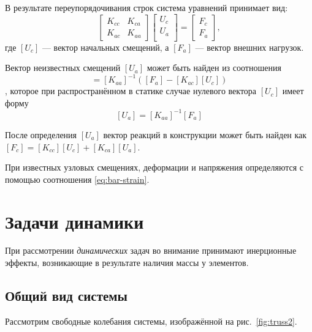 \documentclass[10pt]{article}
\numberwithin{equation}{section}
\newcommand{\matr}[1]{[#1]}
\newcommand{\figref}[1]{рис. \ref{#1}}
\begin{document}
В результате переупорядочивания строк система уравнений принимает вид:
\begin{equation*}
  \label{eq:system-partitioned}
  \begin{bmatrix}
    K_{cc}& K_{ca} \\
    K_{ac}& K_{aa}
  \end{bmatrix}
  \begin{bmatrix}
    U_c\\
    U_a\\
  \end{bmatrix}
  =
  \begin{bmatrix}
    F_c\\
    F_a
  \end{bmatrix},
\end{equation*}
где $\matr{U_c}$ — вектор начальных смещений, а $\matr{F_a}$ — вектор
внешних нагрузок.

Вектор неизвестных смещений $\matr{U_a}$ может быть найден из соотношения
\begin{equation}
  \matr{U_a} = \matr{K_{aa}}^{-1}(\matr{F_a} - \matr{K_{ac}}\matr{U_c})
\end{equation},
которое при распространённом в статике случае нулевого вектора
$\matr{U_c}$ имеет форму
\begin{equation}
  \label{eq:displacements}
  \matr{U_a} = \matr{K_{aa}}^{-1}\matr{F_a}
\end{equation}

После определения $\matr{U_a}$ вектор реакций в конструкции может быть
найден как $\matr{F_c} = \matr{K_{cc}}\matr{U_c} +
\matr{K_{ca}}\matr{U_a}$.

При известных узловых смещениях, деформации и напряжения определяются
с помощью соотношения \eqref{eq:bar-strain}.

\clearpage
\section{Задачи динамики}

При рассмотрении \emph{динамических} задач во внимание принимают
инерционные эффекты, возникающие в результате наличия массы у
элементов.

\subsection{Общий вид системы}

Рассмотрим свободные колебания системы, изображённой на
\figref{fig:truss2}.
\end{document}
